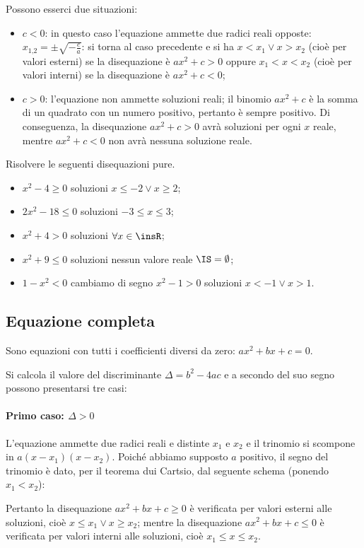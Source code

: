 Possono esserci due situazioni:
\begin{itemize}
\item $c<0$: in questo caso l'equazione ammette due radici reali opposte: $x_{1\text{,}2}=\pm \sqrt{-\frac c a}$: si torna al caso precedente e si ha $x<x_1\vee x>x_2$ (cioè per valori esterni) se la disequazione è $ax^2+c>0$ oppure $x_1<x<x_2$ (cioè per valori interni) se la disequazione è $ax^2+c<0$;
\item $c>0$: l'equazione non ammette soluzioni reali; il binomio $ax^2+c$ è la somma di un quadrato con un numero positivo, pertanto è sempre positivo. Di conseguenza, la disequazione $ax^2+c>0$ avrà soluzioni per ogni $x$ reale, mentre $ax^2+c<0$ non avrà nessuna soluzione reale.
\end{itemize}

\begin{exrig}
\begin{esempio}
Risolvere le seguenti disequazioni pure.
\begin{itemize}
\item $x^2-4\ge 0$ soluzioni $x\le -2\vee x\ge 2$;
\item $2x^2-18\le 0$ soluzioni $-3\le x\le 3$;
\item $x^2+4>0$ soluzioni $\forall x\in \insR$;
\item $x^2+9\le 0$ soluzioni nessun valore reale $\IS=\emptyset$;
\item $1-x^2<0$ cambiamo di segno $x^2-1>0$ soluzioni $x<-1\vee x>1$.
\end{itemize}
\end{esempio}
\end{exrig}

\pagebreak

\subsection{Equazione completa}
Sono equazioni con tutti i coefficienti diversi da zero: $ax^2+bx+c=0$.

Si calcola il valore del discriminante $\Delta =b^2-4{ac}$ e a secondo del suo segno possono presentarsi tre casi:

\paragraph{Primo caso: $\Delta >0$}
L'equazione ammette due radici reali e distinte $x_1$ e $x_2$ e il trinomio si scompone in $a(x-x_1)(x-x_2)$. Poiché abbiamo supposto $a$ positivo, il segno del trinomio è dato, per il teorema dui Cartsio, dal seguente schema (ponendo $x_1<x_2$):
\begin{center}

\end{center}
Pertanto la disequazione ${ax}^2+{bx}+c\ge 0$ è verificata per valori esterni alle soluzioni, cioè $x\le x_1\vee x\ge x_2$; mentre la disequazione ${ax}^2+{bx}+c\le 0$ è verificata per valori interni alle soluzioni, cioè $x_1\le x\le x_2$.

